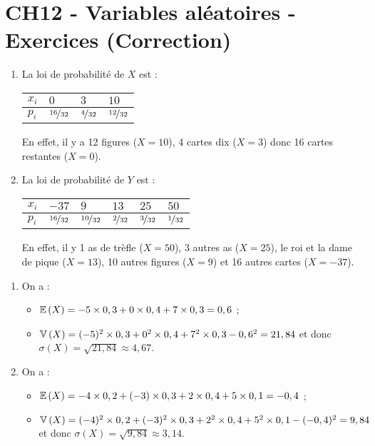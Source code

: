 \documentclass[a4paper,11pt]{article}
\author{Pierquet}
\title{\nomfichier}
\begin{document}
\pagestyle{fancy}

\part{CH12 - Variables aléatoires - Exercices (Correction)}

\medskip


\begin{enumerate}
	\item La loi de probabilité de $X$ est :
	\begin{center}
		\begin{tabularx}{60mm}{|Y|Y|Y|Y|}
			\hline
			$x_i$ & $0$ & $3$ & $10$ \\ \hline
			$p_i$ & $\nicefrac{16}{32}$ & $\nicefrac{4}{32}$ & $\nicefrac{12}{32}$ \\ \hline
		\end{tabularx}
	\end{center}
	En effet, il y a 12 figures ($X=10$), 4 cartes dix ($X=3$) donc 16 cartes restantes ($X=0$).
	\item La loi de probabilité de $Y$ est :
	\begin{center}
		\begin{tabularx}{60mm}{|Y|Y|Y|Y|Y|Y|}
			\hline
			$x_i$ & $-37$ & $9$ & $13$ & $25$ & $50$ \\ \hline
			$p_i$ & $\nicefrac{16}{32}$ & $\nicefrac{10}{32}$ & $\nicefrac{2}{32}$ & $\nicefrac{3}{32}$ & $\nicefrac{1}{32}$ \\ \hline
		\end{tabularx}
	\end{center}
	En effet, il y 1 as de trèfle ($X=50$), 3 autres as ($X=25$), le roi et la dame de pique ($X=13$), 10 autres figures ($X=9$) et 16 autres cartes ($X=-37$).
\end{enumerate} 

\medskip


\begin{enumerate}
	\item On a :
	\begin{itemize}
		\item $\mathbb{E}\left({X}\right)=-5 \times 0,3 + 0 \times 0,4 + 7 \times 0,3 = 0,6$ ;
		\item $\mathbb{V}\left({X}\right)=(-5)^2 \times 0,3 + 0^2 \times 0,4 + 7^2 \times 0,3 - 0,6^2 = 21,84$ et donc $\sigma(X)=\sqrt{21,84} \approx 4,67$.
	\end{itemize}
	\item On a :
	\begin{itemize}
		\item $\mathbb{E}\left({X}\right)=-4 \times 0,2 + (-3) \times 0,3 + 2 \times 0,4 + 5 \times 0,1 = -0,4$ ;
		\item $\mathbb{V}\left({X}\right)=(-4)^2 \times 0,2 + (-3)^2 \times 0,3 + 2^2 \times 0,4 + 5^2 \times 0,1 - (-0,4)^2 = 9,84$ et donc $\sigma(X)=\sqrt{9,84} \approx 3,14$.
	\end{itemize}
\end{enumerate}
\end{document}
